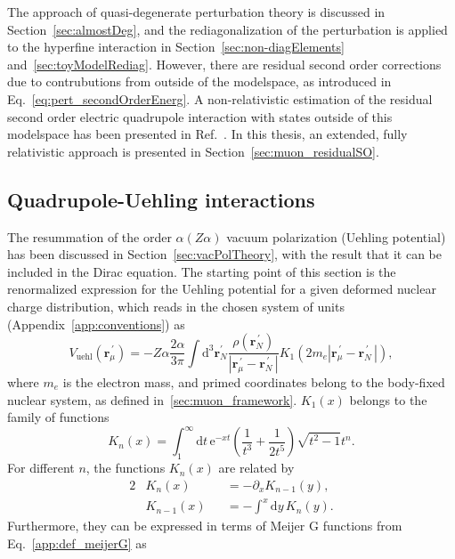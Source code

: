 The approach of quasi-degenerate perturbation theory is discussed in Section~\ref{sec:almostDeg}, and the rediagonalization of the perturbation is applied to the hyperfine interaction in Section~\ref{sec:non-diagElements} and~\ref{sec:toyModelRediag}. However, there are residual second order corrections due to contrubutions from outside of the modelspace, as introduced in Eq.~\eqref{eq:pert_secondOrderEnerg}. A non-relativistic estimation of the residual second order electric quadrupole interaction with states outside of this modelspace has been presented in Ref.~\cite{chen1970}. In this thesis, an extended, fully relativistic approach is presented in Section~\ref{sec:muon_residualSO}.

\subsection{Quadrupole-Uehling interactions}
\label{sec:muon_quadUehl}
The resummation of the order $\alpha (Z\alpha)$ vacuum polarization (Uehling potential) has been discussed in Section~\ref{sec:vacPolTheory}, with the result that it can be included in the Dirac equation. The starting point of this section is the renormalized expression for the Uehling potential for a given deformed nuclear charge distribution, which reads in the chosen system of units (Appendix~\ref{app:conventions}) as~\cite{Fullerton1976}
\begin{equation}
{V_{\text{uehl}}(\mathbf{r}_\mu^{\,\prime})}{=}{-Z\alpha\frac{2 \alpha}{3\pi} \int \text{d}^3\mathbf{r}_N^{\prime} \frac{\rho(\mathbf{r}_N^{\,\prime})}{|\mathbf{r}_\mu^{\,\prime} - \mathbf{r}_N^{\,\prime}\,|} K_1(2m_e{|\mathbf{r}_\mu^{\,\prime} - \mathbf{r}_N^{\,\prime}\,|}),}
\label{eq:Vvp}
\end{equation}
where $m_e$ is the electron mass, and primed coordinates belong to the body-fixed nuclear system, as defined in~\ref{sec:muon_framework}. $K_1(x)$ belongs to the family of functions
\begin{equation}
K_n(x)=\int_1^\infty \text{d}t\,\text{e}^{-xt}\left(\frac{1}{t^3}+\frac{1}{2t^5}\right)\sqrt{t^2-1}t^n.
\label{eq:defKn}
\end{equation}
For different $n$, the functions $K_n(x)$ are related by
\begin{alignat}{2}
&K_n(x)&&=-\partial_x K_{n-1}(y),\\
&K_{n-1}(x)&&=-\int^x\text{d}y\, K_n(y).
\label{eq:Kninfo}
\end{alignat}
Furthermore, they can be expressed in terms of Meijer G functions from Eq.~\eqref{app:def_meijerG} as
